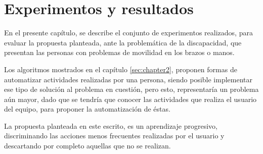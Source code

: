 \chapter{Experimentos y resultados}
\label{sec:chapter5}

En el presente cap\'itulo, se describe el conjunto de experimentos realizados,
 para evaluar la propuesta planteada, ante la problem\'atica de la discapacidad, 
 que presentan las personas con problemas de movilidad en los brazos o manos.



Los algoritmos mostrados en el cap\'itulo \ref{sec:chapter2}, proponen formas
 de automatizar actividades realizadas por una persona, siendo posible 
 implementar ese tipo de soluci\'on al problema en cuesti\'on, pero esto, 
 representar\'ia un problema a\'un mayor, dado que se tendr\'ia que conocer 
 las actividades que realiza el usuario del equipo, para proponer la 
 automatizaci\'on de \'estas. 


La propuesta planteada en este escrito, es un aprendizaje progresivo,
 discriminando las acciones menos frecuentes realizadas por el usuario y 
 descartando por completo aquellas que no se realizan.






